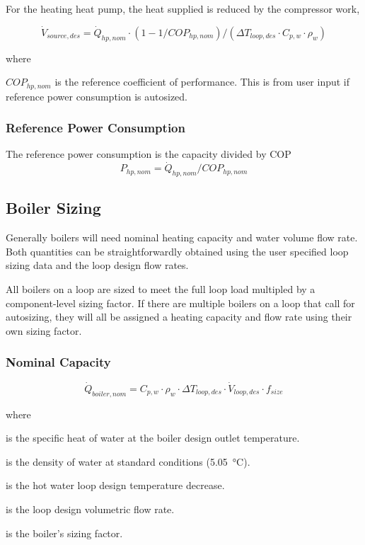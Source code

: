 For the heating heat pump, the heat supplied is reduced by the compressor work,

\begin{equation}
\dot V_{source,des} = \dot Q_{hp,nom} \cdot (1 - 1/COP_{hp,nom})/(\Delta T_{loop,des} \cdot C_{p,w} \cdot \rho_w)
\end{equation}

where

\( COP_{hp,nom} \) is the reference coefficient of performance.  This is from user input if reference power consumption is autosized.

\subsubsection{Reference Power Consumption}\label{wwhp-ref-power-consumption}

The reference power consumption is the capacity divided by COP
\begin{equation}
P_{hp,nom} = \dot Q_{hp,nom} / COP_{hp,nom}
\end{equation}

\subsection{Boiler Sizing}\label{boiler-sizing}

Generally boilers will need nominal heating capacity and water volume flow rate. Both quantities can be straightforwardly obtained using the user specified loop sizing data and the loop design flow rates.

All boilers on a loop are sized to meet the full loop load multipled by a component-level sizing factor. If there are multiple boilers on a loop that call for autosizing, they will all be assigned a heating capacity and flow rate using their own sizing factor.

\subsubsection{Nominal Capacity}\label{nominal-capacity}

\begin{equation}
\dot Q_{boiler,nom} = C_{p,w} \cdot \rho_w \cdot \Delta T_{loop,des} \cdot \dot{V}_{loop,des} \cdot f_{size}
\end{equation}

\noindent where
\begin{description}[labelwidth=1cm, leftmargin=!]
\item[$C_{p,w}$] is the specific heat of water at the boiler design outlet temperature.
\item[$\rho_w$] is the density of water at standard conditions (\SI{5.05}{\celsius}).
\item[$\Delta T_{loop,des}$] is the hot water loop design temperature decrease.
\item[$\dot{V}_{loop,des}$] is the loop design volumetric flow rate.
\item[$f_{size}$] is the boiler's sizing factor.
\end{description}

